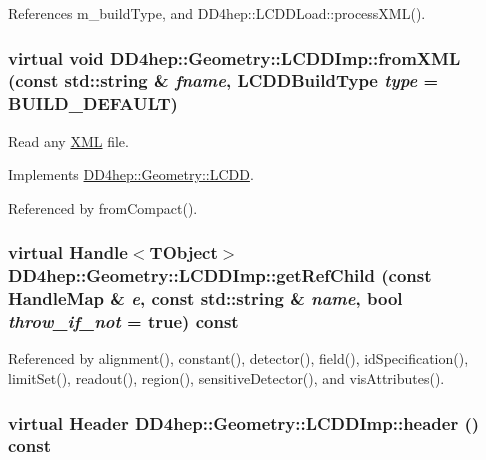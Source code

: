 References m\_\-buildType, and DD4hep::LCDDLoad::processXML().\hypertarget{class_d_d4hep_1_1_geometry_1_1_l_c_d_d_imp_a23921e95e2ba300135d635e58ecb0c51}{
\subsubsection[{fromXML}]{\setlength{\rightskip}{0pt plus 5cm}virtual void DD4hep::Geometry::LCDDImp::fromXML (const std::string \& {\em fname}, \/  {\bf LCDDBuildType} {\em type} = {\ttfamily BUILD\_\-DEFAULT})}}
\label{class_d_d4hep_1_1_geometry_1_1_l_c_d_d_imp_a23921e95e2ba300135d635e58ecb0c51}


Read any \hyperlink{namespace_d_d4hep_1_1_x_m_l}{XML} file. 

Implements \hyperlink{class_d_d4hep_1_1_geometry_1_1_l_c_d_d_ad6e8de7ab4f0374cea7e3e15e33af66e}{DD4hep::Geometry::LCDD}.

Referenced by fromCompact().\hypertarget{class_d_d4hep_1_1_geometry_1_1_l_c_d_d_imp_ad8724d04e7a03a495f51edea402d318f}{
\subsubsection[{getRefChild}]{\setlength{\rightskip}{0pt plus 5cm}virtual {\bf Handle}$<${\bf TObject}$>$ DD4hep::Geometry::LCDDImp::getRefChild (const {\bf HandleMap} \& {\em e}, \/  const std::string \& {\em name}, \/  bool {\em throw\_\-if\_\-not} = {\ttfamily true}) const}}
\label{class_d_d4hep_1_1_geometry_1_1_l_c_d_d_imp_ad8724d04e7a03a495f51edea402d318f}


Referenced by alignment(), constant(), detector(), field(), idSpecification(), limitSet(), readout(), region(), sensitiveDetector(), and visAttributes().\hypertarget{class_d_d4hep_1_1_geometry_1_1_l_c_d_d_imp_a04116248704015c4691e4918b3ff0c07}{
\subsubsection[{header}]{\setlength{\rightskip}{0pt plus 5cm}virtual {\bf Header} DD4hep::Geometry::LCDDImp::header () const}}
\label{class_d_d4hep_1_1_geometry_1_1_l_c_d_d_imp_a04116248704015c4691e4918b3ff0c07}


